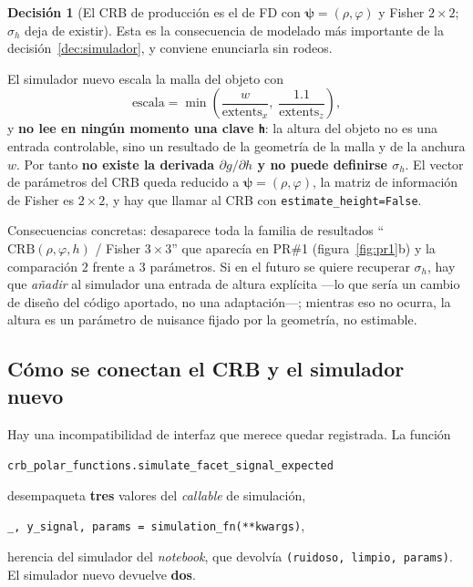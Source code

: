 \documentclass[11pt,a4paper]{article}
\newcommand{\vect}[1]{\boldsymbol{#1}}
\newcommand{\code}[1]{\texttt{#1}}
\theoremstyle{definition}
\newtheorem{decision}{Decisión}
\begin{document}
\begin{decision}[El CRB de producción es el de FD con $\vect\psi=(\rho,\varphi)$
y Fisher $2\times2$; $\sigma_h$ deja de existir]
\label{dec:2param}
Esta es la consecuencia de modelado más importante de la
decisión~\ref{dec:simulador}, y conviene enunciarla sin rodeos.

El simulador nuevo escala la malla del objeto con
%
\begin{equation}
\text{escala} = \min\!\left(\frac{w}{\text{extents}_x},\;
                            \frac{1.1}{\text{extents}_z}\right),
\end{equation}
%
y \textbf{no lee en ningún momento una clave \code{h}}: la altura del objeto no
es una entrada controlable, sino un resultado de la geometría de la malla y de
la anchura $w$. Por tanto \textbf{no existe la derivada $\partial g/\partial h$
y no puede definirse $\sigma_h$}. El vector de parámetros del CRB queda
reducido a $\vect\psi=(\rho,\varphi)$, la matriz de información de Fisher es
$2\times2$, y hay que llamar al CRB con \code{estimate\_height=False}.

Consecuencias concretas: desaparece toda la familia de resultados
\enquote{$\text{CRB}(\rho,\varphi,h)$ / Fisher $3\times3$} que aparecía en PR\#1
(figura~\ref{fig:pr1}b) y la comparación $2$ frente a $3$ parámetros. Si en el
futuro se quiere recuperar $\sigma_h$, hay que \emph{añadir} al simulador una
entrada de altura explícita ---lo que sería un cambio de diseño del código
aportado, no una adaptación---; mientras eso no ocurra, la altura es un parámetro
de nuisance fijado por la geometría, no estimable.
\end{decision}

\subsection{Cómo se conectan el CRB y el simulador nuevo}

Hay una incompatibilidad de interfaz que merece quedar registrada. La función
%
\begin{center}
\code{crb\_polar\_functions.simulate\_facet\_signal\_expected}
\end{center}
%
desempaqueta \textbf{tres} valores del \emph{callable} de simulación,
%
\begin{center}
\code{\_, y\_signal, params = simulation\_fn(**kwargs)},
\end{center}
%
herencia del simulador del \emph{notebook}, que devolvía
\code{(ruidoso, limpio, params)}. El simulador nuevo devuelve \textbf{dos}.
\end{document}
